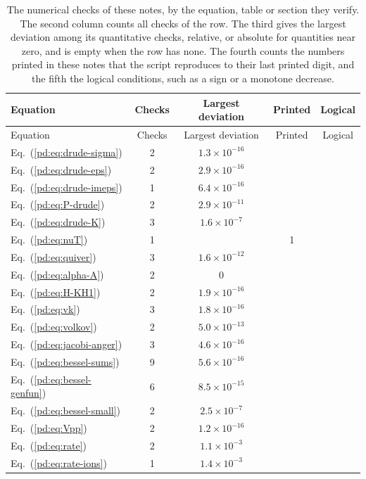 \begin{longtable}{L{4.0cm}cccc}
\caption{The numerical checks of these notes, by the equation, table or section they verify. The second column counts all checks of the row. The third gives the largest deviation among its quantitative checks, relative, or absolute for quantities near zero, and is empty when the row has none. The fourth counts the numbers printed in these notes that the script reproduces to their last printed digit, and the fifth the logical conditions, such as a sign or a monotone decrease.}\label{pd:tab:checks}\\
\toprule
Equation & Checks & Largest deviation & Printed & Logical\\
\midrule
\endfirsthead
\toprule
Equation & Checks & Largest deviation & Printed & Logical\\
\midrule
\endhead
\bottomrule
\endfoot
Eq.~(\ref*{pd:eq:drude-sigma}) & 2 & $1.3\times10^{-16}$ &  & \\
Eq.~(\ref*{pd:eq:drude-eps}) & 2 & $2.9\times10^{-16}$ &  & \\
Eq.~(\ref*{pd:eq:drude-imeps}) & 1 & $6.4\times10^{-16}$ &  & \\
Eq.~(\ref*{pd:eq:P-drude}) & 2 & $2.9\times10^{-11}$ &  & \\
Eq.~(\ref*{pd:eq:drude-K}) & 3 & $1.6\times10^{-7}$ &  & \\
Eq.~(\ref*{pd:eq:nuT}) & 1 &  & 1 & \\
Eq.~(\ref*{pd:eq:quiver}) & 3 & $1.6\times10^{-12}$ &  & \\
Eq.~(\ref*{pd:eq:alpha-A}) & 2 & $0$ &  & \\
Eq.~(\ref*{pd:eq:H-KH1}) & 2 & $1.9\times10^{-16}$ &  & \\
Eq.~(\ref*{pd:eq:vk}) & 3 & $1.8\times10^{-16}$ &  & \\
Eq.~(\ref*{pd:eq:volkov}) & 2 & $5.0\times10^{-13}$ &  & \\
Eq.~(\ref*{pd:eq:jacobi-anger}) & 3 & $4.6\times10^{-16}$ &  & \\
Eq.~(\ref*{pd:eq:bessel-sums}) & 9 & $5.6\times10^{-16}$ &  & \\
Eq.~(\ref*{pd:eq:bessel-genfun}) & 6 & $8.5\times10^{-15}$ &  & \\
Eq.~(\ref*{pd:eq:bessel-small}) & 2 & $2.5\times10^{-7}$ &  & \\
Eq.~(\ref*{pd:eq:Vpp}) & 2 & $1.2\times10^{-16}$ &  & \\
Eq.~(\ref*{pd:eq:rate}) & 2 & $1.1\times10^{-3}$ &  & \\
Eq.~(\ref*{pd:eq:rate-ions}) & 1 & $1.4\times10^{-3}$ &  & \\

\end{longtable}
